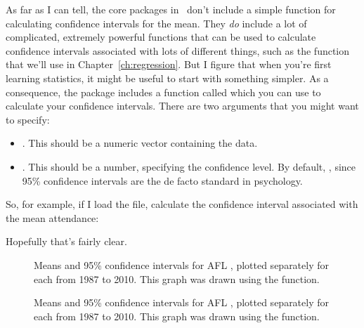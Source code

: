 As far as I can tell, the core packages in \R\ don't include a simple function for calculating confidence intervals for the mean. They {\it do} include a lot of complicated, extremely powerful functions that can be used to calculate confidence intervals associated with lots of different things, such as the  function that we'll use in Chapter~\ref{ch:regression}. But I figure that when you're first learning statistics, it might be useful to start with something simpler. As a consequence, the  package includes a function called  which you can use to calculate your confidence intervals. There are two arguments that you might want to specify:
\begin{itemize} \itemsep -2pt
\item {}. This should be a numeric vector containing the data. 
\item {}. This should be a number, specifying the confidence level. By default, , since 95\% confidence intervals are the de facto standard in psychology.
\end{itemize}
So, for example, if I load the  file, calculate the confidence interval associated with the mean attendance:
Hopefully that's fairly clear. 



\begin{figure}
\begin{center}
\caption{Means and 95\% confidence intervals for AFL , plotted separately for each  from 1987 to 2010. This graph was drawn using the  function.}
\label{fig:bargraph.CI}
\HR
\end{center}
\end{figure}

\begin{figure}
\begin{center}
\caption{Means and 95\% confidence intervals for AFL , plotted separately for each  from 1987 to 2010. This graph was drawn using the  function.}
\label{fig:lineplot.CI}
\HR
\end{center}
\end{figure}


